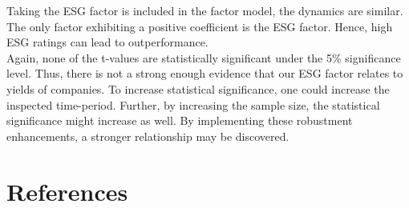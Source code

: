 \documentclass[12pt, a4paper]{article}%
\begin{document}
Taking the ESG factor is included in the factor model, the dynamics are similar. The only factor exhibiting a positive coefficient is the ESG factor. Hence, high ESG ratings can lead to outperformance.\\
Again, none of the t-values are statistically significant under the 5\% significance level. Thus, there is not a strong enough evidence that our ESG factor relates to yields of companies.
To increase statistical significance, one could increase the inspected time-period. Further, by increasing the sample size, the statistical significance might increase as well. By implementing these robustment enhancements, a stronger relationship may be discovered.


\section{References}
\printbibliography[heading=none]
\end{document}
